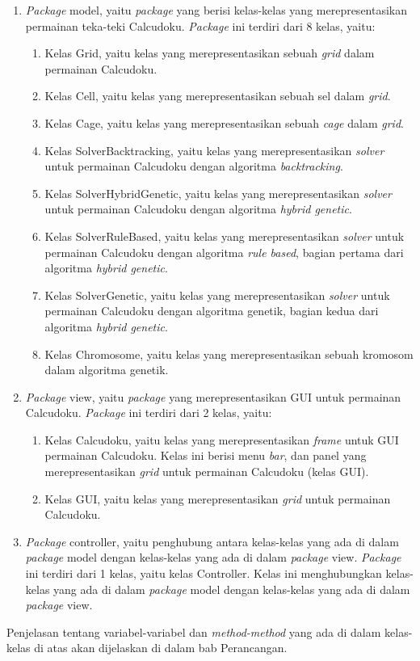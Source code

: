 \begin{enumerate}
\item \textit{Package} model, yaitu \textit{package} yang berisi kelas-kelas yang merepresentasikan permainan teka-teki Calcudoku. \textit{Package} ini terdiri dari 8 kelas, yaitu:
	\begin{enumerate}
	\item Kelas Grid, yaitu kelas yang merepresentasikan sebuah \textit{grid} dalam permainan Calcudoku.
	\item Kelas Cell, yaitu kelas yang merepresentasikan sebuah sel dalam \textit{grid}.
	\item Kelas Cage, yaitu kelas yang merepresentasikan sebuah \textit{cage} dalam \textit{grid}.
	\item Kelas SolverBacktracking, yaitu kelas yang merepresentasikan \textit{solver} untuk permainan Calcudoku dengan algoritma \textit{backtracking}.
	\item Kelas SolverHybridGenetic, yaitu kelas yang merepresentasikan \textit{solver} untuk permainan Calcudoku dengan algoritma \textit{hybrid genetic}.
	\item Kelas SolverRuleBased, yaitu kelas yang merepresentasikan \textit{solver} untuk permainan Calcudoku dengan algoritma \textit{rule based}, bagian pertama dari algoritma \textit{hybrid genetic}.
	\item Kelas SolverGenetic, yaitu kelas yang merepresentasikan \textit{solver} untuk permainan Calcudoku dengan algoritma genetik, bagian kedua dari algoritma \textit{hybrid genetic}.
	\item Kelas Chromosome, yaitu kelas yang merepresentasikan sebuah kromosom dalam algoritma genetik.
	\end{enumerate}
\item \textit{Package} view, yaitu \textit{package} yang merepresentasikan GUI untuk permainan Calcudoku. \textit{Package} ini terdiri dari 2 kelas, yaitu:
	\begin{enumerate}
	\item Kelas Calcudoku, yaitu kelas yang merepresentasikan \textit{frame} untuk GUI permainan Calcudoku. Kelas ini berisi menu \textit{bar}, dan panel yang merepresentasikan \textit{grid} untuk permainan Calcudoku (kelas GUI).
	\item Kelas GUI, yaitu kelas yang merepresentasikan \textit{grid} untuk permainan Calcudoku.
	\end{enumerate}
\item \textit{Package} controller, yaitu penghubung antara kelas-kelas yang ada di dalam \textit{package} model dengan kelas-kelas yang ada di dalam \textit{package} view. \textit{Package} ini terdiri dari 1 kelas, yaitu kelas Controller. Kelas ini menghubungkan kelas-kelas yang ada di dalam  \textit{package} model dengan kelas-kelas yang ada di dalam \textit{package} view.
\end{enumerate}

Penjelasan tentang variabel-variabel dan \textit{method-method} yang ada di dalam kelas-kelas di atas akan dijelaskan di dalam bab Perancangan.